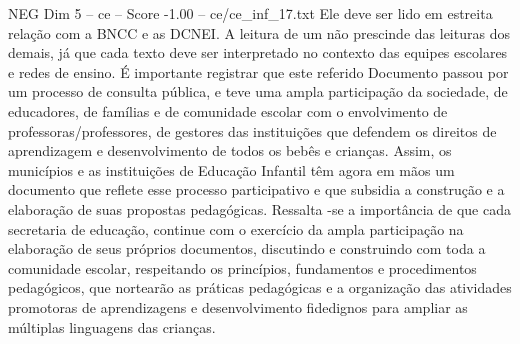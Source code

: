 \begin{textsample}{NEG Dim 5 – ce – Score -1.00 – ce/ce\_inf\_17.txt}
Ele deve ser lido em estreita relação com a BNCC e as DCNEI.
A leitura de um não prescinde das leituras dos demais, já que cada texto deve ser interpretado no contexto das equipes escolares e redes de ensino.
É importante registrar que este referido Documento passou por um processo de consulta pública, e teve uma ampla participação da sociedade, de educadores, de famílias e de comunidade escolar com o envolvimento de professoras/professores, de gestores das instituições que defendem os direitos de aprendizagem e desenvolvimento de todos os bebês e crianças.
Assim, os municípios e as instituições de Educação Infantil têm agora em mãos um documento que reflete esse processo participativo e que subsidia a construção e a elaboração de suas propostas pedagógicas.
Ressalta -se a importância de que cada secretaria de educação, continue com o exercício da ampla participação na elaboração de seus próprios documentos, discutindo e construindo com toda a comunidade escolar, respeitando os princípios, fundamentos e procedimentos pedagógicos, que nortearão as práticas pedagógicas e a organização das atividades promotoras de aprendizagens e desenvolvimento fidedignos para ampliar as múltiplas linguagens das crianças.

\end{textsample}
